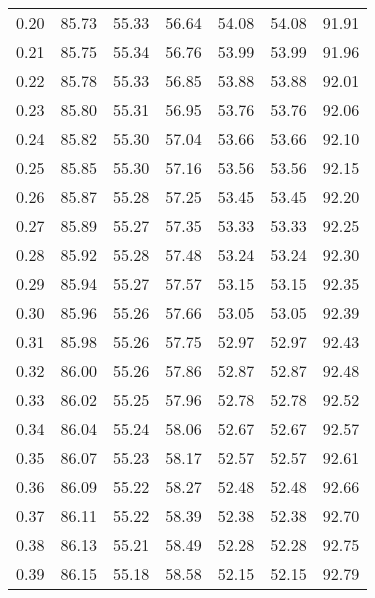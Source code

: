 \begin{tabular}{|c|c|c|c|c|c|c|}
      0.20 &     85.73 &     55.33 &      56.64 &   54.08 &      54.08 &         91.91 \\
      0.21 &     85.75 &     55.34 &      56.76 &   53.99 &      53.99 &         91.96 \\
      0.22 &     85.78 &     55.33 &      56.85 &   53.88 &      53.88 &         92.01 \\
      0.23 &     85.80 &     55.31 &      56.95 &   53.76 &      53.76 &         92.06 \\
      0.24 &     85.82 &     55.30 &      57.04 &   53.66 &      53.66 &         92.10 \\
      0.25 &     85.85 &     55.30 &      57.16 &   53.56 &      53.56 &         92.15 \\
      0.26 &     85.87 &     55.28 &      57.25 &   53.45 &      53.45 &         92.20 \\
      0.27 &     85.89 &     55.27 &      57.35 &   53.33 &      53.33 &         92.25 \\
      0.28 &     85.92 &     55.28 &      57.48 &   53.24 &      53.24 &         92.30 \\
      0.29 &     85.94 &     55.27 &      57.57 &   53.15 &      53.15 &         92.35 \\
      0.30 &     85.96 &     55.26 &      57.66 &   53.05 &      53.05 &         92.39 \\
      0.31 &     85.98 &     55.26 &      57.75 &   52.97 &      52.97 &         92.43 \\
      0.32 &     86.00 &     55.26 &      57.86 &   52.87 &      52.87 &         92.48 \\
      0.33 &     86.02 &     55.25 &      57.96 &   52.78 &      52.78 &         92.52 \\
      0.34 &     86.04 &     55.24 &      58.06 &   52.67 &      52.67 &         92.57 \\
      0.35 &     86.07 &     55.23 &      58.17 &   52.57 &      52.57 &         92.61 \\
      0.36 &     86.09 &     55.22 &      58.27 &   52.48 &      52.48 &         92.66 \\
      0.37 &     86.11 &     55.22 &      58.39 &   52.38 &      52.38 &         92.70 \\
      0.38 &     86.13 &     55.21 &      58.49 &   52.28 &      52.28 &         92.75 \\
      0.39 &     86.15 &     55.18 &      58.58 &   52.15 &      52.15 &         92.79 \\

\end{tabular}
